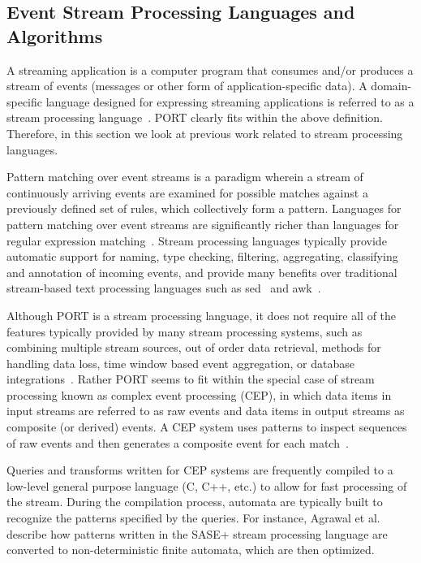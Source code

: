 \subsection{Event Stream Processing Languages and Algorithms}

A streaming application
is a computer program
that consumes and/or
produces
a stream of events (messages or other form of application-specific data).
A domain-specific language designed for expressing streaming applications
is referred to as a
stream processing language~\cite{DBLP:journals/sigmod/HirzelBBVSV18}.
PORT clearly
fits within the above definition.
Therefore, in this
section we look at previous work related to stream processing languages.

Pattern matching
over event streams is a paradigm
wherein a stream of continuously arriving events are examined for
possible matches against a previously defined set of rules,
which collectively form a pattern.
Languages for pattern matching over event
streams are significantly richer than languages for regular expression
matching~\cite{DBLP:conf/sigmod/AgrawalDGI08}.
Stream processing languages typically provide automatic
support for naming, type checking, filtering, aggregating, classifying and
annotation of incoming events, and provide many benefits over traditional
stream-based text processing languages such as sed~\cite{Mcmahon1979sed} and
awk~\cite{DBLP:journals/spe/AhoKW79}.

Although PORT is a stream processing language, it does not
require all of the features typically
provided by many stream processing systems, such as
combining multiple stream sources,
out of order data retrieval,
methods for handling data loss,
time window based event aggregation,
or database integrations~\cite{DBLP:journals/csur/DayarathnaP18}.
Rather PORT seems to fit within the special case of
stream processing known as complex event processing (CEP),
in which data items in input streams are referred to as raw events and data items in output streams
as composite (or derived) events. A CEP system uses patterns to inspect
sequences of raw events and then generates a composite event for each
match~\cite{DBLP:journals/ibmrd/HirzelAGJKKMNSSW13}.

Queries and transforms written for CEP systems are
frequently compiled to a low-level general purpose language (C, C++, etc.) to allow for fast
processing of the stream. During the compilation process, automata are typically
built to recognize the patterns specified by the queries. For instance, Agrawal et
al.~\cite{DBLP:conf/sigmod/AgrawalDGI08} describe how patterns written in the SASE+ stream
processing language are converted to non-deterministic finite automata, which are then
optimized.

